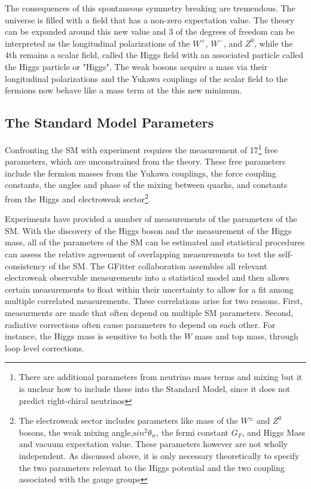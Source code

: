 The consequences of this spontaneous symmetry breaking are tremendous.
The universe is filled with a field that has a non-zero expectation value.
The theory can be expanded around this new value and 3 of the
degrees of freedom can be interpreted as the longitudinal polarizations of
the $W^+$, $W^-$, and $Z^0$, while the 4th remains a scalar field, called
the Higgs field with an associated particle called the Higgs particle or "Higgs".
The weak bosons acquire a mass via their longitudinal polarizations and the Yukawa
couplings of the scalar field to the fermions now behave like a mass term
at the this new minimum. 


\subsection{The Standard Model Parameters}


Confronting the SM with experiment requires the measurement of
17\footnote{There are additional parameters from neutrino mass terms and
mixing but it is unclear how to include these into the Standard Model,
since it does not predict right-chiral neutrinos} free parameters, which
are unconstrained from the theory. These free parameters include the fermion
masses from the Yukawa couplings, the force coupling constants, the angles and phase of the mixing between
quarks, and constants from the Higgs and electroweak sector\footnote{ The electroweak sector includes
parameters like mass of the $W^{\pm}$ and $Z^0$ bosons, the weak mixing
angle,${\mathrm sin^2}\theta_w$, the fermi constant $G_F$, and Higgs
Mass and vacuum expectation value. These parameters however are not
wholly independent. As discussed above, it is only necessary
theoretically to specify the two parameters relevant to the Higgs
potential and the two coupling associated with the gauge groups }.

Experiments have provided a number of measurements of the
parameters of the SM\cite{lepew:2010vi}.  With the discovery of the Higgs boson and 
the measurement of the Higgs mass, all of the parameters
of the SM can be estimated and statistical procedures can assess
the relative agreement of overlapping measurements to test the self-consistency 
of the SM. The GFitter collaboration assembles
all relevant electroweak observable measurements into a statistical
model and then allows certain measurements to float within their
uncertainty to allow for a fit among multiple correlated measurements\cite{GFitter}. 
These correlations arise for two reasons. First, measurments are made that often
depend on multiple SM parameters. Second, radiative corrections often cause 
parameters to depend on each other. For instance, the Higgs mass is sensitive
to both the $W$ mass and top mass, through loop level corrections. 

